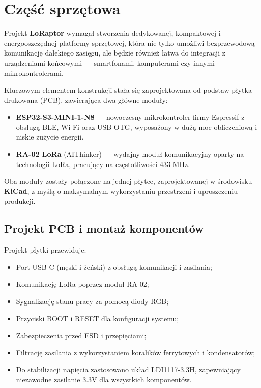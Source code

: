 \section{Część sprzętowa}

Projekt \textbf{LoRaptor} wymagał stworzenia dedykowanej, kompaktowej i energooszczędnej platformy sprzętowej, która nie tylko umożliwi bezprzewodową komunikację dalekiego zasięgu, ale będzie również łatwa do integracji z urządzeniami końcowymi — smartfonami, komputerami czy innymi mikrokontrolerami. 

Kluczowym elementem konstrukcji stała się zaprojektowana od podstaw płytka drukowana (PCB), zawierająca dwa główne moduły:
\begin{itemize}
	\item \textbf{ESP32-S3-MINI-1-N8} --- nowoczesny mikrokontroler firmy Espressif z obsługą BLE, Wi-Fi oraz USB-OTG, wyposażony w dużą moc obliczeniową i niskie zużycie energii.
	\item \textbf{RA-02 LoRa} (AIThinker) --- wydajny moduł komunikacyjny oparty na technologii LoRa, pracujący na częstotliwości 433 MHz.
\end{itemize}
Oba moduły zostały połączone na jednej płytce, zaprojektowanej w środowisku \textbf{KiCad}, z myślą o maksymalnym wykorzystaniu przestrzeni i uproszczeniu produkcji.

\clearpage
\subsection{Projekt PCB i montaż komponentów}

Projekt płytki przewiduje:
\begin{itemize}
	\item Port USB-C (męski i żeński) z obsługą komunikacji i zasilania;
	\item Komunikację LoRa poprzez moduł RA-02;
	\item Sygnalizację stanu pracy za pomocą diody RGB;
	\item Przyciski BOOT i RESET dla konfiguracji systemu;
	\item Zabezpieczenia przed ESD i przepięciami;
	\item Filtrację zasilania z wykorzystaniem koralików ferrytowych i kondensatorów;
	\item Do stabilizacji napięcia zastosowano układ LDI1117-3.3H, zapewniający niezawodne zasilanie 3.3V dla wszystkich komponentów.
\end{itemize}

